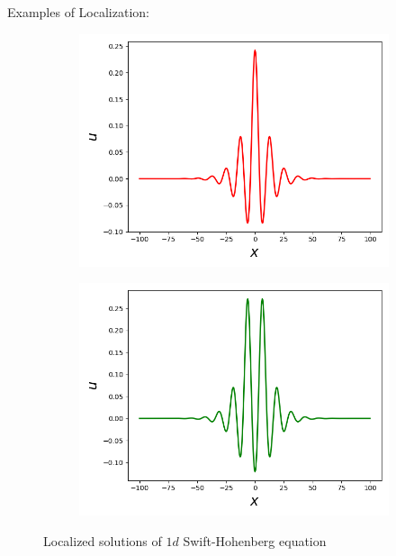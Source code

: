 \documentclass{beamer}
\begin{document}
\begin{frame}{Examples of Localization:}
\begin{figure}[ht]
\begin{subfigure}{.4\textwidth}
  \centering
  \includegraphics[scale=0.25]
  {Figs/shper_1.png}  
  \caption{}
  \label{fig:vary_V0}
\end{subfigure}
\begin{subfigure}{.4\textwidth}
  \centering
  \includegraphics[scale = 0.25]
  {Figs/shper_2.png}  
  \caption{}
  \label{fig:vary_B}
\end{subfigure}
\caption{Localized solutions of $1d$ Swift-Hohenberg equation}
\label{fig:fig}
\end{figure}
\end{frame}
\end{document}
